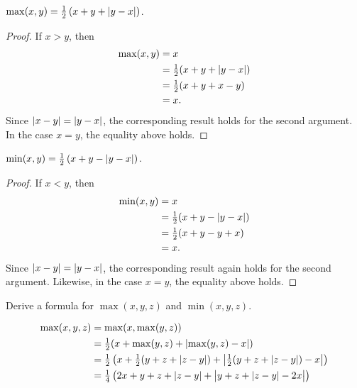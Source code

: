\documentclass[11pt]{article}
\begin{document}
\begin{enumerate}
          $\max(x, y) = \frac{1}{2} \left( x + y + \lvert y - x\rvert \right)$.
          \begin{proof}
              If $x > y$, then
              \[
                  \begin{aligned}
                      \max(x, y) & = x                                  \\
                                 & = \tfrac{1}{2} (x + y + \lvert y - x\rvert) \\
                                 & = \tfrac{1}{2} (x + y + x - y)       \\
                                 & = x.
                  \end{aligned}
              \]
              Since $\lvert x - y\rvert = \lvert y - x\rvert$, the corresponding result holds for the second
              argument.  In the case $x = y$, the equality above holds.
          \end{proof}

          $\min(x, y) = \frac{1}{2} \left( x + y - \lvert y - x\rvert \right)$.
          \begin{proof}
              If $x < y$, then
              \[
                  \begin{aligned}
                      \min(x, y) & = x                                  \\
                                 & = \tfrac{1}{2} (x + y - \lvert y - x\rvert) \\
                                 & = \tfrac{1}{2} (x + y - y + x)       \\
                                 & = x.
                  \end{aligned}
              \]
              Since $\lvert x - y\rvert = \lvert y - x\rvert$, the corresponding result again holds for the second
              argument.  Likewise, in the case $x = y$, the equality above holds.
          \end{proof}

          Derive a formula for $\max(x, y, z)$ and $\min(x, y, z)$.

          \[
              \begin{aligned}
                  \max(x, y, z)
                   &
                  = \max(x, \max(y, z))
                  \\ &
                  = \tfrac{1}{2} ( x + \max(y, z) + \lvert \max(y, z) - x \rvert )
                  \\ &
                  = \tfrac{1}{2} \left(
                  x
                  + \tfrac{1}{2}(y + z + \lvert z - y\rvert)
                  + \big\lvert
                  \tfrac{1}{2}(y + z + \lvert z - y\rvert)
                  - x
                  \big\rvert \right)
                  \\ &
                  = \tfrac{1}{4} \left(
                  2x + y + z + \lvert z - y\rvert
                  +
                  \big\lvert
                  y + z + \lvert z - y\rvert - 2x
                  \big\rvert \right)
              \end{aligned}
          \]


\end{enumerate}
\end{document}
